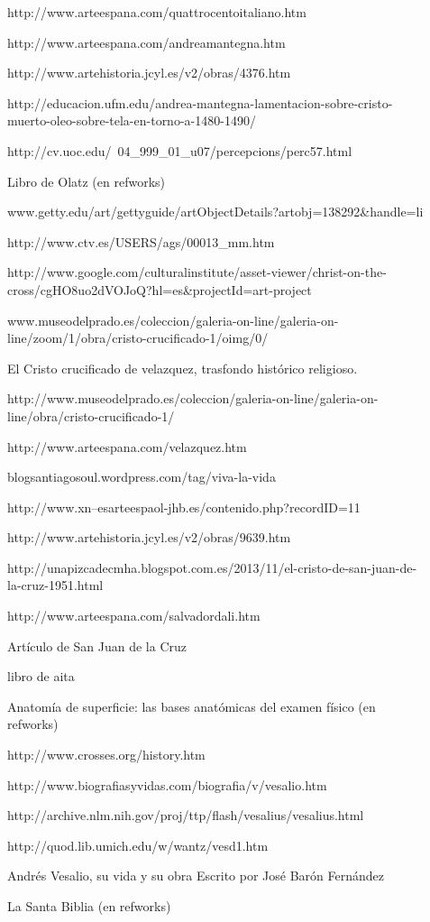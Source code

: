 \begin{description}
\item[] http://www.arteespana.com/quattrocentoitaliano.htm
\item[] http://www.arteespana.com/andreamantegna.htm
\item[] http://www.artehistoria.jcyl.es/v2/obras/4376.htm
\item[] http://educacion.ufm.edu/andrea-mantegna-lamentacion-sobre-cristo-muerto-oleo-sobre-tela-en-torno-a-1480-1490/
\item[] http://cv.uoc.edu/~04\_999\_01\_u07/percepcions/perc57.html
\item[] Libro de Olatz (en refworks)

\item[] www.getty.edu/art/gettyguide/artObjectDetails?artobj=138292\&handle=li
\item[] http://www.ctv.es/USERS/ags/00013\_mm.htm
\item[] http://www.google.com/culturalinstitute/asset-viewer/christ-on-the-cross/cgHO8uo2dVOJoQ?hl=es\&projectId=art-project

\item[] www.museodelprado.es/coleccion/galeria-on-line/galeria-on-line/zoom/1/obra/cristo-crucificado-1/oimg/0/
\item[] El Cristo crucificado de velazquez, trasfondo histórico religioso. 
\item[] http://www.museodelprado.es/coleccion/galeria-on-line/galeria-on-line/obra/cristo-crucificado-1/
\item[] http://www.arteespana.com/velazquez.htm

\item[] blogsantiagosoul.wordpress.com/tag/viva-la-vida
\item[] http://www.xn--esarteespaol-jhb.es/contenido.php?recordID=11
\item[] http://www.artehistoria.jcyl.es/v2/obras/9639.htm
\item[] http://unapizcadecmha.blogspot.com.es/2013/11/el-cristo-de-san-juan-de-la-cruz-1951.html
\item[] http://www.arteespana.com/salvadordali.htm
\item[] Artículo de San Juan de la Cruz
\item[] libro de aita

\item[] Anatomía de superficie: las bases anatómicas del examen físico (en refworks)

\item[] http://www.crosses.org/history.htm

\item[] http://www.biografiasyvidas.com/biografia/v/vesalio.htm
\item[] http://archive.nlm.nih.gov/proj/ttp/flash/vesalius/vesalius.html
\item[] http://quod.lib.umich.edu/w/wantz/vesd1.htm
\item[] Andrés Vesalio, su vida y su obra Escrito por José Barón Fernández

\item[] La Santa Biblia (en refworks)

\end{description}